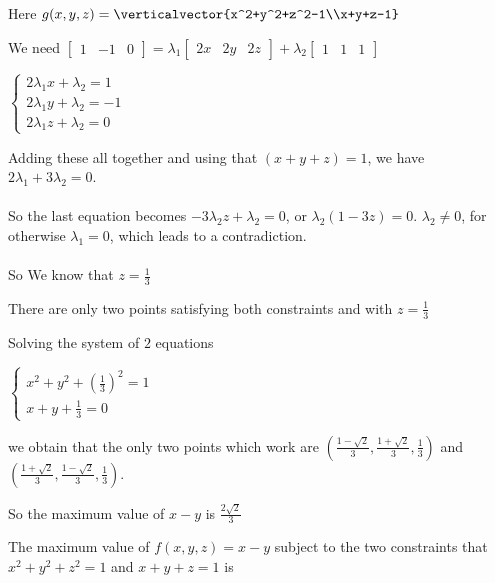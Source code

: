 \documentclass{ximera}
\begin{document}
	\begin{question}
		\begin{hint}
			Here $g(x,y,z) = \verticalvector{x^2+y^2+z^2-1\\x+y+z-1}$
		\end{hint}
		\begin{hint}
			We need \( \begin{bmatrix} 1 & -1 & 0\end{bmatrix} = \lambda_1 \begin{bmatrix} 2x & 2y & 2z\end{bmatrix}+ \lambda_2\begin{bmatrix}  1 & 1 & 1\end{bmatrix}\)
		\end{hint}
		\begin{hint}
				\(\begin{cases}
					2\lambda_1 x+\lambda_2 = 1\\
					2\lambda_1 y+\lambda_2 = -1\\
					2\lambda_1 z+\lambda_2 = 0 
				\end{cases}\)
				
				Adding these all together and using that $(x+y+z)=1$, we have $2\lambda_1+3\lambda_2 = 0$.
				\\
				\\
				So the last equation becomes $-3\lambda_2 z+\lambda_2 = 0$, or $\lambda_2(1-3z) = 0$.  $\lambda_2 \neq 0$, for otherwise $\lambda_1=0$, which leads to 
				a contradiction.
				\\
				\\
				So We know that $z = \frac{1}{3}$
		\end{hint}
		\begin{hint}
			There are only two points satisfying both constraints and with $z = \frac{1}{3}$
		\end{hint}
		\begin{hint}
			Solving the system of $2$ equations
			
			\(
				\begin{cases}
					x^2+y^2+(\frac{1}{3})^2 = 1\\
					x+y+\frac{1}{3} = 0
				\end{cases}
			\) 
			
			we obtain that the only two points which work are $(\frac{1-\sqrt{2}}{3},\frac{1+\sqrt{2}}{3},\frac{1}{3})$ and $(\frac{1+\sqrt{2}}{3},\frac{1-\sqrt{2}}{3},\frac{1}{3})$.
		\end{hint}
		\begin{hint}
			So the maximum value of $x-y$ is $\frac{2\sqrt{2}}{3}$
		\end{hint}
		The maximum value of  $f(x,y,z) = x-y$ subject to the two constraints that $x^2+y^2+z^2 = 1$ and $x+y+z=1$ is 

	\end{question}		
		
\end{document}
